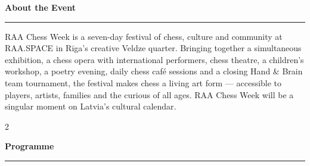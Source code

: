 \documentclass[a4paper,10pt]{article}
\newcommand{\sectionrule}[1]{%
  \vspace{3pt}%
  {\color{raared}\bfseries\large #1}\\[-3pt]%
  {\color{raared}\rule{\linewidth}{0.8pt}}%
  \vspace{2pt}%
}
\begin{document}
\begin{center}
\begin{minipage}{0.90\paperwidth}

\vspace{0.2cm}

\sectionrule{About the Event}

RAA Chess Week is a seven-day festival of chess, culture and community at RAA.SPACE in Rīga's creative Veldze quarter. Bringing together a simultaneous exhibition, a chess opera with international performers, chess theatre, a children's workshop, a poetry evening, daily chess café sessions and a closing Hand \& Brain team tournament, the festival makes chess a living art form — accessible to players, artists, families and the curious of all ages. RAA Chess Week will be a singular moment on Latvia's cultural calendar.

\vspace{0.1cm}

\begin{multicols}{2}

\sectionrule{Programme}


\end{multicols}
\end{minipage}
\end{center}
\end{document}
